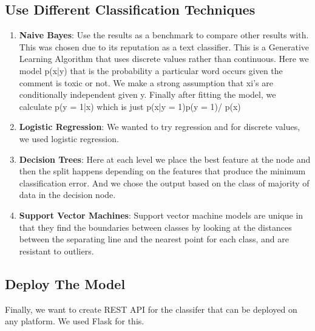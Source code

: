 \documentclass[11pt]{article}
\begin{document}
\subsection*{Use Different Classification Techniques}
\begin{enumerate}
	\item \textbf{Naive Bayes}: Use the results as a benchmark to 
	compare other results with. This was chosen due to its reputation as a text classifier. This is a Generative Learning Algorithm that uses discrete values rather than continuous. Here we model p(x|y) that is the probability a particular word occurs given the comment is toxic or not. We make a strong assumption that xi’s are conditionally independent given y. Finally after fitting the model, we calculate
	p(y = 1|x) which is just p(x|y = 1)p(y = 1)/ p(x)
	
	\item \textbf{Logistic Regression}: We wanted to try regression and for discrete values, we used logistic regression.
	\item \textbf{Decision Trees}: Here at each level we place the best feature at the node and then the split happens  depending on the features that produce the minimum classification error. And we chose the output based on the class of majority of data in the decision node.

	\item \textbf{Support Vector Machines}: Support vector machine models are unique in that they find the boundaries between classes by looking at the distances between the separating line and the nearest point for each class, and are resistant to outliers. 

\end{enumerate}
\subsection*{Deploy The Model}
Finally, we want to create REST API for the classifer that can be deployed on any platform. We used Flask for this.	

\end{document}
